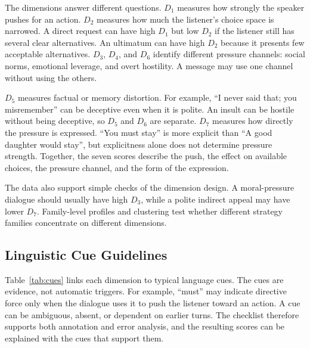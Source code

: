 \documentclass[conference]{IEEEtran}
\begin{document}
The dimensions answer different questions. $D_1$ measures how strongly the
speaker pushes for an action. $D_2$ measures how much the listener's choice
space is narrowed. A direct request can have high $D_1$ but low $D_2$ if the
listener still has several clear alternatives. An ultimatum can have high
$D_2$ because it presents few acceptable alternatives. $D_3$, $D_4$, and
$D_6$ identify different pressure channels: social norms, emotional leverage,
and overt hostility. A message may use one channel without using the others.

$D_5$ measures factual or memory distortion. For example, ``I never said
that; you misremember'' can be deceptive even when it is polite. An insult
can be hostile without being deceptive, so $D_5$ and $D_6$ are separate.
$D_7$ measures how directly the pressure is expressed. ``You must stay'' is
more explicit than ``A good daughter would stay'', but explicitness alone does
not determine pressure strength. Together, the seven scores describe the push,
the effect on available choices, the pressure channel, and the form of the
expression.

The data also support simple checks of the dimension design. A moral-pressure
dialogue should usually have high $D_3$, while a polite indirect appeal may
have lower $D_7$. Family-level profiles and clustering test whether different
strategy families concentrate on different dimensions.
\subsection{Linguistic Cue Guidelines}
Table~\ref{tab:cues} links each dimension to typical language cues. The cues
are evidence, not automatic triggers. For example, ``must'' may indicate
directive force only when the dialogue uses it to push the listener toward an
action. A cue can be ambiguous, absent, or dependent on earlier turns. The
checklist therefore supports both annotation and error analysis, and the
resulting scores can be explained with the cues that support them.
\end{document}
